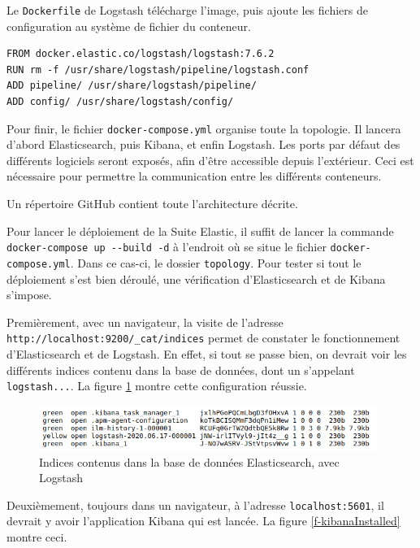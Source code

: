 \documentclass[paper=a4, fontsize=11pt]{scrartcl}
\begin{document}
Le \verb,Dockerfile, de Logstash télécharge l'image, puis ajoute les fichiers de configuration au système de fichier du conteneur.
\begin{lstlisting}
FROM docker.elastic.co/logstash/logstash:7.6.2
RUN rm -f /usr/share/logstash/pipeline/logstash.conf
ADD pipeline/ /usr/share/logstash/pipeline/
ADD config/ /usr/share/logstash/config/
\end{lstlisting}

Pour finir, le fichier \verb,docker-compose.yml, organise toute la topologie. Il lancera d'abord Elasticsearch, puis Kibana, et enfin Logstash. Les ports par défaut des différents logiciels seront exposés, afin d'être accessible depuis l'extérieur. Ceci est nécessaire pour permettre la communication entre les différents conteneurs.

Un répertoire GitHub \cite{jael24_jael24tb_elasticstack_2020} contient toute l'architecture décrite.

Pour lancer le déploiement de la Suite Elastic, il suffit de lancer la commande \verb,docker-compose up --build -d, à l'endroit où se situe le fichier \verb,docker-compose.yml,. Dans ce cas-ci, le dossier \verb,topology,.
Pour tester si tout le déploiement s'est bien déroulé, une vérification d'Elasticsearch et de Kibana s'impose. 

Premièrement, avec un navigateur, la visite de l'adresse \verb,http://localhost:9200/_cat/indices, permet de constater le fonctionnement d'Elasticsearch et de Logstash. En effet, si tout se passe bien, on devrait voir les différents indices contenu dans la base de données, dont un s'appelant \verb,logstash...,. La figure \ref{f-elsearchIndices} montre cette configuration réussie.

\begin{figure}[H]
    \centering
    \includegraphics[width=11cm]{img/screenshots/elasticsearchLogstashOk.png}
    \caption{Indices contenus dans la base de données Elasticsearch, avec Logstash}
    \label{f-elsearchIndices}
\end{figure}

Deuxièmement, toujours dans un navigateur, à l'adresse \verb,localhost:5601,, il devrait y avoir l'application Kibana qui est lancée. La figure \ref{f-kibanaInstalled} montre ceci.
\end{document}
